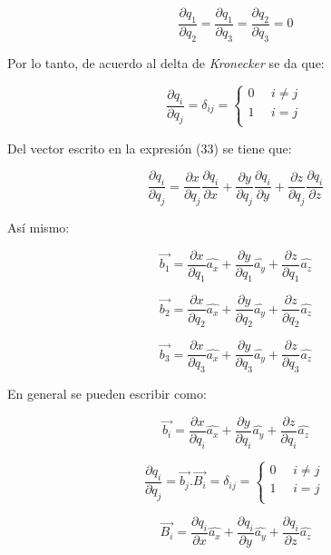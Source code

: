 \documentclass[]{article}
\begin{document}
\[\frac{\partial q_{1}}{\partial q_{2}} = \frac{\partial q_{1}}{\partial q_{3}} = \frac{\partial q_{2}}{\partial q_{3}} = 0\]

Por lo tanto, de acuerdo al delta de \emph{Kronecker} se da que:

\[\frac{\partial q_{i}}{\partial q_{j}} = \delta_{ij} = \left\{ \begin{matrix}
0\ \ \ \ \ \ i \neq j \\
1\ \ \ \ \ \ i = j \\
\end{matrix} \right.\ \]

Del vector escrito en la expresión (33) se tiene que:

\[\frac{\partial q_{i}}{\partial q_{j}} = \frac{\partial x}{\partial q_{j}}\frac{\partial q_{i}}{\partial x} + \frac{\partial y}{\partial q_{j}}\frac{\partial q_{i}}{\partial y} + \frac{\partial z}{\partial q_{j}}\frac{\partial q_{i}}{\partial z}\]

Así mismo:

\[\overrightarrow{b_{1}} = \frac{\partial x}{\partial q_{1}}\widehat{a_{x}} + \frac{\partial y}{\partial q_{1}}\widehat{a_{y}} + \frac{\partial z}{\partial q_{1}}\widehat{a_{z}}\]

\[\overrightarrow{b_{2}} = \frac{\partial x}{\partial q_{2}}\widehat{a_{x}} + \frac{\partial y}{\partial q_{2}}\widehat{a_{y}} + \frac{\partial z}{\partial q_{2}}\widehat{a_{z}}\]

\[\overrightarrow{b_{3}} = \frac{\partial x}{\partial q_{3}}\widehat{a_{x}} + \frac{\partial y}{\partial q_{3}}\widehat{a_{y}} + \frac{\partial z}{\partial q_{3}}\widehat{a_{z}}\]

En general se pueden escribir como:

\[\overrightarrow{b_{i}} = \frac{\partial x}{\partial q_{i}}\widehat{a_{x}} + \frac{\partial y}{\partial q_{i}}\widehat{a_{y}} + \frac{\partial z}{\partial q_{i}}\widehat{a_{z}}\]

\[\frac{\partial q_{i}}{\partial q_{j}} = \overrightarrow{b_{j}}.\overrightarrow{B_{i}} = \delta_{ij} = \left\{ \begin{matrix}
0\ \ \ \ \ \ i \neq j \\
1\ \ \ \ \ \ i = j \\
\end{matrix} \right.\ \]

\[\overrightarrow{B_{i}} = \frac{\partial q_{i}}{\partial x}\widehat{a_{x}} + \frac{\partial q_{i}}{\partial y}\widehat{a_{y}} + \frac{\partial q_{i}}{\partial z}\widehat{a_{z}}\]
\end{document}
